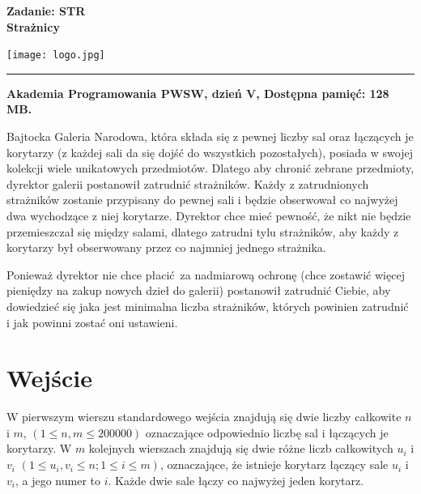 \documentclass[10pt]{article}
\begin{document}
    

    \noindent
    \begin{minipage}{0.5\textwidth}
        \LARGE{\textsf{\textbf{Zadanie: STR\\Strażnicy}}}
    \end{minipage}
    \begin{minipage}{0.5\textwidth}
        \begin{flushright}
            \texttt{[image: logo.jpg]}
        \end{flushright}
    \end{minipage}
    
    \noindent\rule{\textwidth}{0.4pt}
    
    \noindent\textbf{Akademia Programowania PWSW, dzień V, Dostępna pamięć: 128 MB.}
    \vspace{1em}
    
    
    \noindent
    Bajtocka Galeria Narodowa, która składa się z pewnej liczby sal oraz łączących je korytarzy (z każdej sali da się dojść do wszystkich pozostałych), posiada w swojej kolekcji wiele unikatowych przedmiotów. Dlatego aby chronić zebrane przedmioty, dyrektor galerii postanowił zatrudnić strażników. Każdy z zatrudnionych strażników zostanie przypisany do pewnej sali i będzie obserwował co najwyżej dwa wychodzące z niej korytarze. Dyrektor chce mieć pewność, że nikt nie będzie przemieszczał się między salami, dlatego zatrudni tylu strażników, aby każdy z korytarzy był obserwowany przez co najmniej jednego strażnika.
    
    Ponieważ dyrektor nie chce płacić za nadmiarową ochronę (chce zostawić więcej pieniędzy na zakup nowych dzieł do galerii) postanowił zatrudnić Ciebie, aby dowiedzieć się jaka jest minimalna liczba strażników, których powinien zatrudnić i jak powinni zostać oni ustawieni.


    \section*{Wejście}
    
    W pierwszym wierszu standardowego wejścia znajdują się dwie liczby całkowite $n$ i $m$, $(1\leq n, m\leq 200000)$ oznaczające odpowiednio liczbę sal i łączących je korytarzy. W $m$ kolejnych wierszach znajdują się dwie różne liczb całkowitych $u_{i}$ i $v_{i}$ $(1\leq u_{i}, v_{i}\leq n; 1\leq i\leq m)$, oznaczające, że istnieje korytarz łączący sale $u_{i}$ i $v_{i}$, a jego numer to $i$. Każde dwie sale łączy co najwyżej jeden korytarz.
\end{document}
